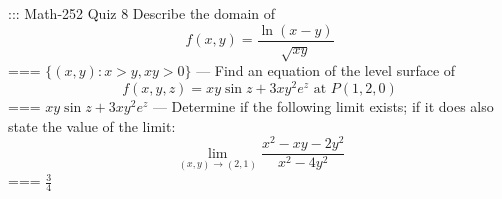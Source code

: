 ::: Math-252 Quiz 8
Describe the domain of
\[f(x,y)=\frac{\ln(x-y)}{\sqrt{xy}}\]
===
\(\{(x,y):x>y,xy>0\}\)
---
Find an equation of the level surface of
\[f(x,y,z)=xy\sin z+3xy^2e^z\text{ at }P(1,2,0)\]
===
\(xy\sin z+3xy^2e^z\)
---
Determine if the following limit exists; if it does also state the value of the
limit:
\[\lim_{(x,y)\to(2,1)}\frac{x^2-xy-2y^2}{x^2-4y^2}\]
===
\(\frac{3}{4}\)
